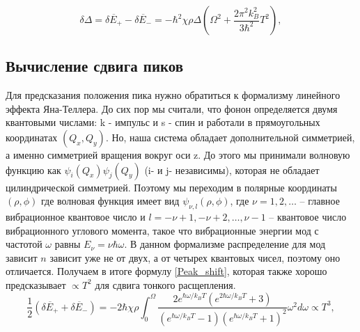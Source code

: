 \begin{equation}
    \label{Shift}
    \delta \Delta = \overline{\delta E_{+}} - \overline{\delta E_{-}} = -\hbar^2 
    \chi \rho \Delta \left( \Omega^2 + \frac{2\pi^2 k_B^2}{3\hbar^2}T^2 \right),
\end{equation}
    

\subsection{Вычисление сдвига пиков}
Для предсказания положения пика нужно обратиться к формализму линейного 
эффекта Яна-Теллера. До сих пор мы считали, что фонон определяется двумя
квантовыми числами: k - импульс и s - спин и работали в прямоугольных 
координатах $(Q_x,Q_y)$. Но, наша система обладает дополнительной симметрией,
а именно симметрией вращения вокруг оси z. До этого мы принимали волновую
функцию как $\psi_i(Q_x)\psi_j(Q_y)$ (i- и j- независимы), которая не обладает 
цилиндрической симметрией. Поэтому мы переходим в полярные координаты 
$(\rho, \phi)$ где волновая функция имеет вид $\psi_{\nu, l}(\rho, \phi)$, 
где $\nu = 1, 2, \dots$ -- главное вибрационное квантовое число и
$l = -\nu + 1, -\nu + 2, \dots, \nu - 1$ -- квантовое число вибрационного
углового момента, такое что вибрационные энергии мод с частотой $\omega$
равны $E_{\nu} = \nu\hbar\omega$. В данном формализме распределение
для мод зависит $n$ зависит уже не от двух, а от четырех квантовых чисел,
поэтому оно отличается. Получаем в итоге формулу \ref{Peak_shift},
которая также хорошо предсказывает $\propto T^2$ для сдвига тонкого расщепления.
\begin{equation}
    \label{Peak_shift}
    \frac{1}{2} \left( \overline{\delta E_+} + \overline{\delta E_-} \right) 
    = -2 \hbar \chi \rho \int_0^\Omega \frac{2e^{\hbar \omega / k_B T} 
    \left( e^{2\hbar \omega / k_B T} + 3 \right)}{\left( e^{\hbar \omega / k_B T} 
    - 1 \right) \left( e^{\hbar \omega / k_B T} + 1 \right)^2} \omega^2 d\omega \propto T^3,
\end{equation}
